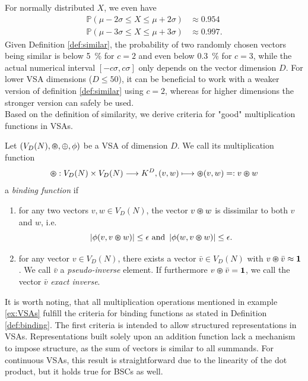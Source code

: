 For normally distributed $X$, we even have
\begin{align*}
	\mathbb{P}\left(\mu-2\sigma \leq X \leq \mu+2\sigma \right) &\approx 0.954 \\
	\mathbb{P}\left(\mu-3\sigma \leq X \leq \mu+3\sigma \right) &\approx 0.997.
\end{align*}
Given Definition \ref{def:similar}, the probability of two randomly chosen vectors being similar is below \SI{5}{\percent} for $c=2$ and even below \SI{0.3}{\percent} for $c=3$, while the actual numerical interval $\left[-c\sigma, c\sigma\right]$ only depends on the vector dimension $D$.
For lower \ac{VSA} dimensions ($D \leq 50$), it can be beneficial to work with a weaker version of definition \ref{def:similar} using $c=2$, whereas for higher dimensions the stronger version can safely be used. \\
Based on the definition of similarity, we derive criteria for "good" multiplication functions in \acp{VSA}.
\begin{defn}
	\label{def:binding}
	Let $(V_{D}(N), \varoast, \oplus, \phi)$ be a \acrfull{VSA} of dimension $D$. We call its multiplication function 
	\[\varoast: V_{D}(N) \times V_{D}(N) \longrightarrow K^{D}, (v,w) \longmapsto \varoast(v,w) =: v\varoast w\]
	a \emph{binding function} if 
	\begin{enumerate}
		\item for any two vectors $v, w \in V_{D}(N)$, the vector $v \varoast w$ is dissimilar to both $v$ and $w$, i.e.
		\[
		\left| \phi(v,v \varoast w) \right| \leq \epsilon \textrm{ and } \left| \phi(w,v \varoast w) \right| \leq \epsilon.
		\]
		\item for any vector $v \in V_{D}(N)$, there exists a vector $\bar{v} \in V_{D}(N)$ with $v \varoast \bar{v} \approx \mathbf{1}$. We call $\bar{v}$ a \emph{pseudo-inverse} element. 
		If furthermore $v \varoast \bar{v} = \mathbf{1}$, we call the vector $\bar{v}$ \emph{exact inverse}.
	\end{enumerate}
\end{defn}
It is worth noting, that all multiplication operations mentioned in example \ref{ex:VSAs} fulfill the criteria for binding functions as stated in Definition \ref{def:binding}. 
The first criteria is intended to allow structured representations in \acp{VSA}.
Representations built solely upon an addition function lack a mechanism to impose structure, as the sum of vectors is similar to all summands.
For continuous \acp{VSA}, this result is straightforward due to the linearity of the dot product, but it holds true for \acp{BSC} as well.

